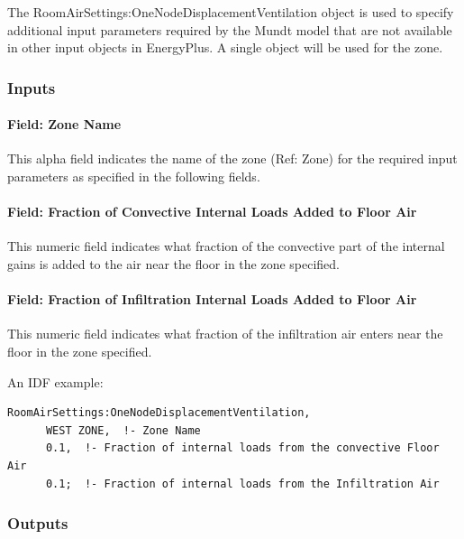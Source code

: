 The RoomAirSettings:OneNodeDisplacementVentilation object is used to specify additional input parameters required by the Mundt model that are not available in other input objects in EnergyPlus. A single object will be used for the zone.

\subsubsection{Inputs}\label{inputs-7-022}

\paragraph{Field: Zone Name}\label{field-zone-name-3-005}

This alpha field indicates the name of the zone (Ref: Zone) for the required input parameters as specified in the following fields.

\paragraph{Field: Fraction of Convective Internal Loads Added to Floor Air}\label{field-fraction-of-convective-internal-loads-added-to-floor-air}

This numeric field indicates what fraction of the convective part of the internal gains is added to the air near the floor in the zone specified.

\paragraph{Field: Fraction of Infiltration Internal Loads Added to Floor Air}\label{field-fraction-of-infiltration-internal-loads-added-to-floor-air}

This numeric field indicates what fraction of the infiltration air enters near the floor in the zone specified.

An IDF example:

\begin{lstlisting}
RoomAirSettings:OneNodeDisplacementVentilation,
      WEST ZONE,  !- Zone Name
      0.1,  !- Fraction of internal loads from the convective Floor Air
      0.1;  !- Fraction of internal loads from the Infiltration Air
\end{lstlisting}

\subsubsection{Outputs}\label{roomairsettingsonenodedisplacementventilation-outputs}


